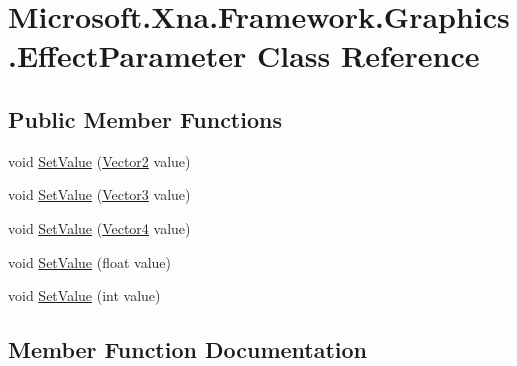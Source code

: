 \hypertarget{class_microsoft_1_1_xna_1_1_framework_1_1_graphics_1_1_effect_parameter}{}\section{Microsoft.\+Xna.\+Framework.\+Graphics.\+Effect\+Parameter Class Reference}
\label{class_microsoft_1_1_xna_1_1_framework_1_1_graphics_1_1_effect_parameter}
\subsection*{Public Member Functions}
\begin{DoxyCompactItemize}
\item 
void \hyperlink{class_microsoft_1_1_xna_1_1_framework_1_1_graphics_1_1_effect_parameter_a4f8f8fe18d5b75e764610e63bd5519b1}{Set\+Value} (\hyperlink{struct_microsoft_1_1_xna_1_1_framework_1_1_vector2}{Vector2} value)
\item 
void \hyperlink{class_microsoft_1_1_xna_1_1_framework_1_1_graphics_1_1_effect_parameter_ae4b40f4d3c7d41cf4c1904a4dd095f78}{Set\+Value} (\hyperlink{struct_microsoft_1_1_xna_1_1_framework_1_1_vector3}{Vector3} value)
\item 
void \hyperlink{class_microsoft_1_1_xna_1_1_framework_1_1_graphics_1_1_effect_parameter_aae87aa08fdaa76b4481b3a2905fb879d}{Set\+Value} (\hyperlink{struct_microsoft_1_1_xna_1_1_framework_1_1_vector4}{Vector4} value)
\item 
void \hyperlink{class_microsoft_1_1_xna_1_1_framework_1_1_graphics_1_1_effect_parameter_ad449786ba691dd5596be40b50954ffbe}{Set\+Value} (float value)
\item 
void \hyperlink{class_microsoft_1_1_xna_1_1_framework_1_1_graphics_1_1_effect_parameter_aba00fd5daffcd42744a6dc8551f75fe4}{Set\+Value} (int value)
\end{DoxyCompactItemize}


\subsection{Member Function Documentation}
\hypertarget{class_microsoft_1_1_xna_1_1_framework_1_1_graphics_1_1_effect_parameter_a4f8f8fe18d5b75e764610e63bd5519b1}{}
